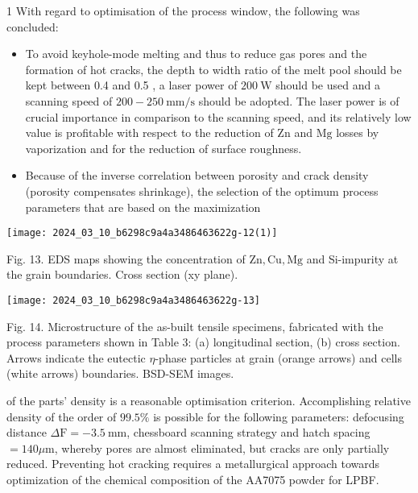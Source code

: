 \documentclass[10pt]{article}
\begin{document}
1 With regard to optimisation of the process window, the following was concluded:

\begin{itemize}
  \item To avoid keyhole-mode melting and thus to reduce gas pores and the formation of hot cracks, the depth to width ratio of the melt pool should be kept between 0.4 and 0.5 , a laser power of $200 \mathrm{~W}$ should be used and a scanning speed of $200-250 \mathrm{~mm} / \mathrm{s}$ should be adopted. The laser power is of crucial importance in comparison to the scanning speed, and its relatively low value is profitable with respect to the reduction of $\mathrm{Zn}$ and $\mathrm{Mg}$ losses by vaporization and for the reduction of surface roughness.
  \item Because of the inverse correlation between porosity and crack density (porosity compensates shrinkage), the selection of the optimum process parameters that are based on the maximization
\end{itemize}

\begin{center}
\texttt{[image: 2024\_03\_10\_b6298c9a4a3486463622g-12(1)]}
\end{center}

Fig. 13. EDS maps showing the concentration of $\mathrm{Zn}, \mathrm{Cu}, \mathrm{Mg}$ and Si-impurity at the grain boundaries. Cross section (xy plane).

\begin{center}
\texttt{[image: 2024\_03\_10\_b6298c9a4a3486463622g-13]}
\end{center}

Fig. 14. Microstructure of the as-built tensile specimens, fabricated with the process parameters shown in Table 3: (a) longitudinal section, (b) cross section. Arrows indicate the eutectic $\eta$-phase particles at grain (orange arrows) and cells (white arrows) boundaries. BSD-SEM images.

of the parts' density is a reasonable optimisation criterion. Accomplishing relative density of the order of $99.5 \%$ is possible for the following parameters: defocusing distance $\Delta \mathrm{F}=-3.5 \mathrm{~mm}$, chessboard scanning strategy and hatch spacing $=140 \mu \mathrm{m}$, whereby pores are almost eliminated, but cracks are only partially reduced. Preventing hot cracking requires a metallurgical approach towards optimization of the chemical composition of the AA7075 powder for LPBF.
\end{document}
